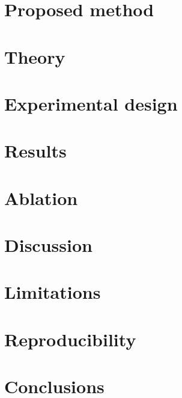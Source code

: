 \documentclass[11pt]{article}
\begin{document}
\section{Proposed method}
\label{sec:proposed-method}


\section{Theory}
\label{sec:theory}


\section{Experimental design}
\label{sec:experimental-design}


\section{Results}
\label{sec:results}


\section{Ablation}
\label{sec:ablation}


\section{Discussion}
\label{sec:discussion}


\section{Limitations}
\label{sec:limitations}


\section{Reproducibility}
\label{sec:reproducibility}


\section{Conclusions}
\label{sec:conclusions}




\end{document}
